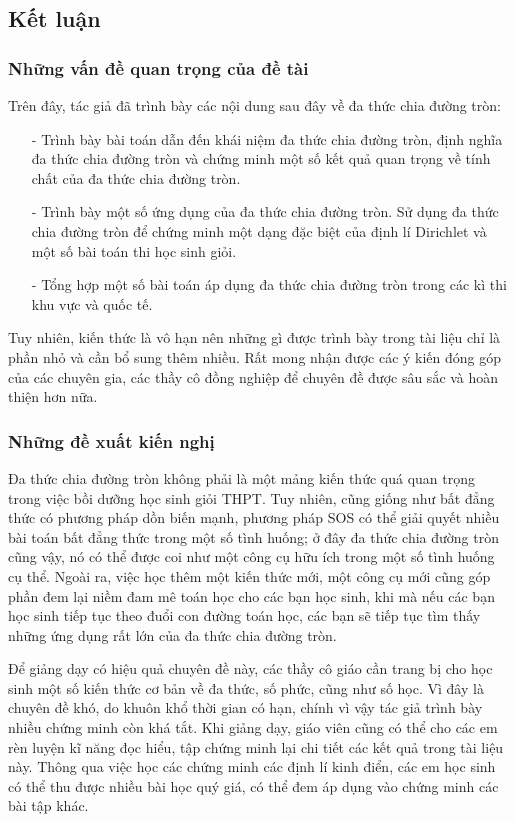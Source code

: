 \subsection{Kết luận}
\subsubsection{Những vấn đề quan trọng của đề tài}
Trên đây, tác giả đã trình bày các nội dung sau đây về đa thức chia đường tròn:
\begin{itemize}
	\item[-] Trình bày bài toán dẫn đến khái niệm đa thức chia đường tròn, định nghĩa đa thức chia đường tròn và chứng minh một số kết quả quan trọng về tính chất của đa thức chia đường tròn.
	\item[-] Trình bày một số ứng dụng của đa thức chia đường tròn. Sử dụng đa thức chia đường tròn để chứng minh một dạng đặc biệt của định lí Dirichlet và một số bài toán thi học sinh giỏi.
	\item[-] Tổng hợp một số bài toán áp dụng đa thức chia đường tròn trong các kì thi khu vực và quốc tế.
\end{itemize}
Tuy nhiên, kiến thức là vô hạn nên những gì được trình bày trong tài liệu chỉ là phần nhỏ và cần bổ sung thêm nhiều. Rất mong nhận được các ý kiến đóng góp của các chuyên gia, các thầy cô đồng nghiệp để chuyên đề được sâu sắc và hoàn thiện hơn nữa.
\subsubsection{Những đề xuất kiến nghị}
Đa thức chia đường tròn không phải là một mảng kiến thức quá quan trọng trong việc bồi dưỡng học sinh giỏi THPT. Tuy nhiên, cũng giống như bất đẳng thức có phương pháp dồn biến mạnh, phương pháp SOS có thể giải quyết nhiều bài toán bất đẳng thức trong một số tình huống; ở đây đa thức chia đường tròn cũng vậy, nó có thể được coi như một công cụ hữu ích trong một số tình huống cụ thể. Ngoài ra, việc học thêm một kiến thức mới, một công cụ mới cũng góp phần đem lại niềm đam mê toán học cho các bạn học sinh, khi mà nếu các bạn học sinh tiếp tục theo đuổi con đường toán học, các bạn sẽ tiếp tục tìm thấy những ứng dụng rất lớn của đa thức chia đường tròn.

Để giảng dạy có hiệu quả chuyên đề này, các thầy cô giáo cần trang bị cho học sinh một số kiến thức cơ bản về đa thức, số phức, cũng như số học. Vì đây là chuyên đề khó, do khuôn khổ thời gian có hạn, chính vì vậy tác giả trình bày nhiều chứng minh còn khá tắt. Khi giảng dạy, giáo viên cũng có thể cho các em rèn luyện kĩ năng đọc hiểu, tập chứng minh lại chi tiết các kết quả trong tài liệu này. Thông qua việc học các chứng minh các định lí kinh điển, các em học sinh có thể thu được nhiều bài học quý giá, có thể đem áp dụng vào chứng minh các bài tập khác.

